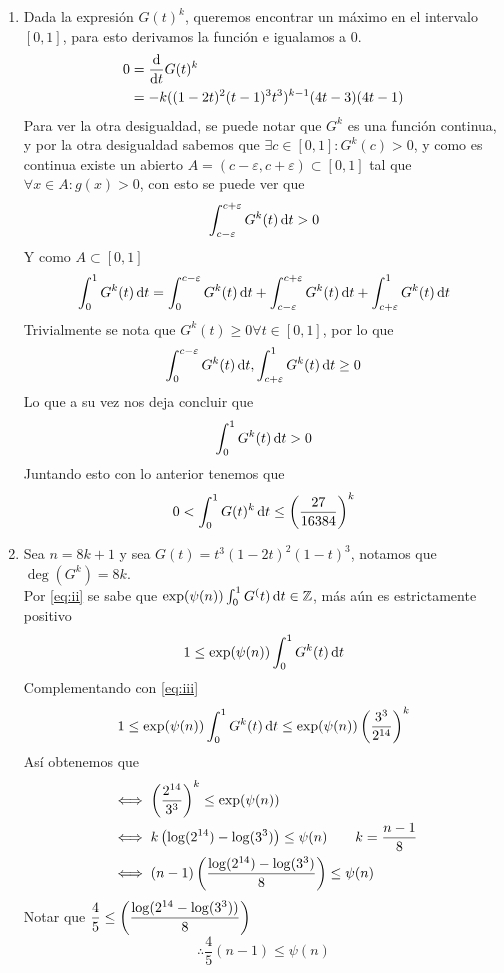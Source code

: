 \begin{sol}
\begin{enumerate}[label = \roman*]
		\item Dada la expresión $G(t)^k$, queremos encontrar un máximo en el intervalo $[0,1]$, para esto derivamos la función e igualamos a 0.
		      \begin{align*}
			      0 & =\frac{\operatorname{d}\!{}}{\operatorname{d}\!{t}}G(t)^k                   \\
			        & =-k ((1-2t)^2(t-1)^3t^3)^{k-1} (4t-3)(4t-1)
		      \end{align*}
		      Para ver la otra desigualdad, se puede notar que $G^k$ es una función continua, y por la otra desigualdad sabemos que $\exists c\in[0,1]:G^k(c)>0$, y como es continua existe un abierto $A=(c-\varepsilon,c+\varepsilon)\subset[0,1]$ tal que $\forall x\in A:g(x)>0$, con esto se puede ver que
		      \[\int_{c-\varepsilon}^{c+\varepsilon}G^k(t)\operatorname{d}\!{t}>0\]
		      Y como $A\subset[0,1]$
		      \[\int_0^1G^k(t)\operatorname{d}\!{t}=\int_0^{c-\varepsilon}G^k(t)\operatorname{d}\!{t}+\int_{c-\varepsilon}^{c+\varepsilon}G^k(t)\operatorname{d}\!{t}+\int_{c+\varepsilon}^1G^k(t)\operatorname{d}\!{t}\]
		      Trivialmente se nota que $G^k(t)\geq0\forall t\in[0,1]$, por lo que
		      \[\int_0^{c-\varepsilon}G^k(t)\operatorname{d}\!{t},\int_{c+\varepsilon}^1G^k(t)\operatorname{d}\!{t}\geq0\]
		      Lo que a su vez nos deja concluir que
		      \[\int_0^1G^k(t)\operatorname{d}\!{t}>0\]
		      Juntando esto con lo anterior tenemos que
		      \begin{equation*}
			      0<\int^1_0G(t)^k\operatorname{d}\!{t}\leq\left(\frac{27}{16384}\right)^k\label{eq:iii}
		      \end{equation*}

		\item Sea $n=8k+1$ y sea $G(t)=t^3(1-2t)^2(1-t)^3$, notamos que $\deg(G^k)=8k$.\\
		      Por \eqref{eq:ii} se sabe que $\exp(\psi(n))\int_0^1G^(t)\operatorname{d}\!{t}\in\mathbb{Z}$, más aún es estrictamente positivo
		      \begin{equation*}
			      1\leq\exp(\psi(n))\int_0^1G^k(t)\operatorname{d}\!{t}
		      \end{equation*}
		      Complementando con \eqref{eq:iii}
		      \begin{equation*}
			      1\leq\exp(\psi(n))\int_0^1G^k(t)\operatorname{d}\!{t}\leq\exp(\psi(n))\left(\frac{3^3}{2^{14}}\right)^k
		      \end{equation*}
		      Así obtenemos que
		      \begin{align*}
			       & \iff\left(\dfrac{2^{14}}{3^3}\right)^k\leq\exp(\psi(n))                    \\
			       & \iff k\left(\log(2^{14})-\log(3^3)\right)\leq\psi(n)\qquad k=\frac{n-1}{8} \\
			       & \iff (n-1)\left(\frac{\log(2^{14})-\log(3^3)}8\right)\leq\psi(n)
		      \end{align*}
		      Notar que $\dfrac45\leq\left(\dfrac{\log(2^{14}-\log(3^3))}8\right)$
		      \begin{equation*}
			      \therefore\frac45(n-1)\leq\psi(n)
		      \end{equation*}
	\end{enumerate}
\end{sol}

